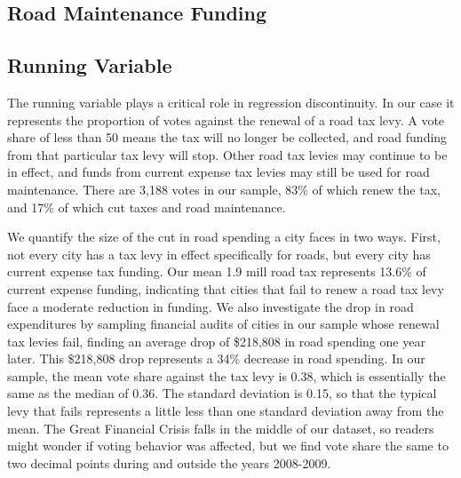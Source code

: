 






\subsection{Road Maintenance Funding}



\subsection{Running Variable}

The running variable plays a critical role in regression discontinuity.  In our case it represents the proportion of votes against the renewal of a road tax levy.  A vote share of less than 50 means the tax will no longer be collected, and road funding from that particular tax levy will stop.  Other road tax levies may continue to be in effect, and funds from current expense tax levies may still be used for road maintenance.  There are 3,188 votes in our sample, 83\% of which renew the tax, and 17\% of which cut taxes and road maintenance.

We quantify the size of the cut in road spending a city faces in two ways.  First, not every city has a tax levy in effect specifically for roads, but every city has current expense tax funding.  Our mean 1.9 mill road tax represents 13.6\% of current expense funding, indicating that cities that fail to renew a road tax levy face a moderate reduction in funding.  We also investigate the drop in road expenditures by sampling financial audits of cities in our sample whose renewal tax levies fail, finding an average drop of \$218,808 in road spending one year later.  This \$218,808 drop represents a 34\% decrease in road spending.  
In our sample, the mean vote share against the tax levy is 0.38, which is essentially the same as the median of 0.36.  The standard deviation is 0.15, so that the typical levy that fails represents a little less than one standard deviation away from the mean. The Great Financial Crisis falls in the middle of our dataset, so readers might wonder if voting behavior was affected, but we find vote share the same to two decimal points during and outside the years 2008-2009. 

